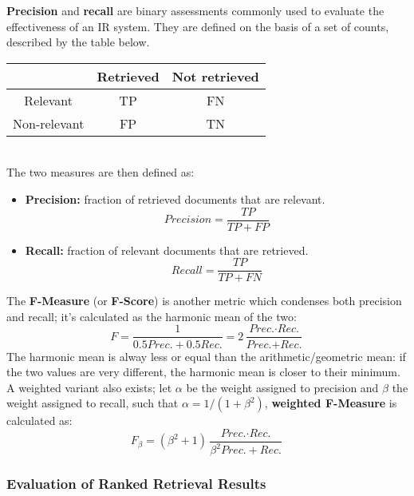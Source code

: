 \textbf{Precision} and \textbf{recall} are binary assessments commonly used to evaluate the effectiveness of an IR system. They are defined on the basis of a set of counts, described by the table below.
\begin{table}[ht]
    \centering
    \begin{tabular}{|c|c|c|}
         \hline
         & Retrieved & Not retrieved \\
        \hline
        Relevant & TP & FN \\
        \hline
        Non-relevant & FP & TN \\
        \hline
    \end{tabular}
\end{table} \\
The two measures are then defined as:
\begin{itemize}
    \item \textbf{Precision:} fraction of retrieved documents that are relevant.
    \begin{equation*}
            \textit{Precision} = \frac{TP}{TP + FP}
    \end{equation*}
    
    \item \textbf{Recall:} fraction of relevant documents that are retrieved.
    \begin{equation*}
        \textit{Recall} = \frac{TP}{TP + FN}
    \end{equation*}
\end{itemize}
The \textbf{F-Measure} (or \textbf{F-Score}) is another metric which condenses both precision and recall; it's calculated as the harmonic mean of the two:
\begin{equation*}
    F = \frac{1}{0.5 \textit{Prec.} + 0.5 \textit{Rec.}} = 2 \frac{\textit{Prec.} \cdot \textit{Rec.}}{\textit{Prec.} + \textit{Rec.}}
\end{equation*}
The harmonic mean is alway less or equal than the arithmetic/geometric mean: if the two values are very different, the harmonic mean is closer to their minimum. A weighted variant also exists; let $\alpha$ be the weight assigned to precision and $\beta$ the weight assigned to recall, such that $\alpha = 1/(1+\beta^2)$, \textbf{weighted F-Measure} is calculated as:
\begin{equation*}
    F_{\beta} = (\beta^2 + 1)\frac{\textit{Prec.} \cdot \textit{Rec.}}{\beta^2 \textit{Prec.} + \textit{Rec.}}
\end{equation*}

\subsubsection{Evaluation of Ranked Retrieval Results}

